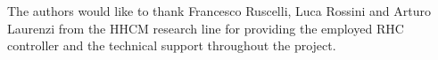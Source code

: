 \begin{Large}
	\vskip1cm
	The authors would like to thank Francesco Ruscelli, Luca Rossini and Arturo Laurenzi from the HHCM research line for providing the employed RHC controller and the technical support throughout the project.\\
	\vskip1cm
\end{Large}
